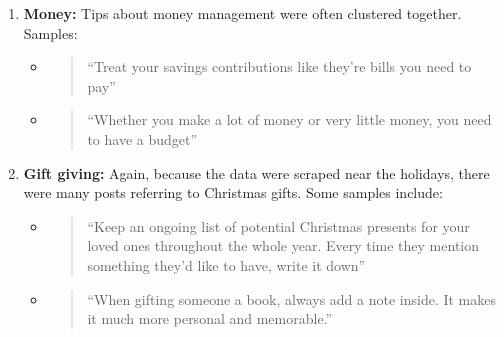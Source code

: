 \documentclass{amsart}
\theoremstyle{definition}
\theoremstyle{remark}
\newcommand{\tql}{\textquotedblleft}
\newcommand{\tqr}{\textquotedblright}
\begin{document}
\begin{enumerate}
\begin{itemize}
\end{itemize}

\item \textbf{Money:} Tips about money management were often clustered together.  Samples:

\begin{itemize}
%
%

\item \begin{quote}
\tql Treat your savings contributions like they're bills you need to pay\tqr
\end{quote}

\item \begin{quote}
\tql Whether you make a lot of money or very little money, you need to have a budget\tqr
\end{quote}

\end{itemize}

\item \textbf{Gift giving:} Again, because the data were scraped near the holidays, there were many posts referring to Christmas gifts.  Some samples include:

\begin{itemize}

\item \begin{quote}
\tql Keep an ongoing list of potential Christmas presents for your loved ones throughout the whole year. Every time they mention something they’d like to have, write it down\tqr
\end{quote}

\item \begin{quote}
\tql When gifting someone a book, always add a note inside. It makes it much more personal and memorable.\tqr
\end{quote}

\end{itemize}


\end{enumerate}
\end{document}
